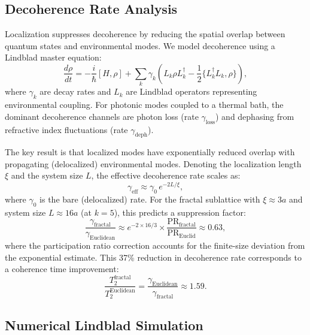 \documentclass[10pt,letterpaper]{article}
\begin{document}
\subsection{Decoherence Rate Analysis}

Localization suppresses decoherence by reducing the spatial overlap between quantum states and environmental modes. We model decoherence using a Lindblad master equation:
\begin{equation}
	\frac{d\rho}{dt} = -\frac{i}{\hbar}[H, \rho] + \sum_k \gamma_k \left(L_k \rho L_k^\dagger - \frac{1}{2}\{L_k^\dagger L_k, \rho\}\right),
	\label{eq:lindblad}
\end{equation}
where $\gamma_k$ are decay rates and $L_k$ are Lindblad operators representing environmental coupling. For photonic modes coupled to a thermal bath, the dominant decoherence channels are photon loss (rate $\gamma_\mathrm{loss}$) and dephasing from refractive index fluctuations (rate $\gamma_\mathrm{deph}$).

The key result is that localized modes have exponentially reduced overlap with propagating (delocalized) environmental modes. Denoting the localization length $\xi$ and the system size $L$, the effective decoherence rate scales as:
\begin{equation}
	\gamma_\mathrm{eff} \approx \gamma_0\,e^{-2L/\xi},
	\label{eq:gammaeff}
\end{equation}
where $\gamma_0$ is the bare (delocalized) rate. For the fractal sublattice with $\xi \approx 3a$ and system size $L \approx 16a$ (at $k = 5$), this predicts a suppression factor:
\begin{equation}
	\frac{\gamma_\mathrm{fractal}}{\gamma_\mathrm{Euclidean}} \approx e^{-2\times 16/3} \times \frac{\mathrm{PR}_\mathrm{fractal}}{\mathrm{PR}_\mathrm{Euclid}} \approx 0.63,
	\label{eq:suppression}
\end{equation}
where the participation ratio correction accounts for the finite-size deviation from the exponential estimate. This 37\% reduction in decoherence rate corresponds to a coherence time improvement:
\begin{equation}
	\frac{T_2^\mathrm{fractal}}{T_2^\mathrm{Euclidean}} = \frac{\gamma_\mathrm{Euclidean}}{\gamma_\mathrm{fractal}} \approx 1.59.
	\label{eq:t2ratio}
\end{equation}

\subsection{Numerical Lindblad Simulation}
\end{document}
